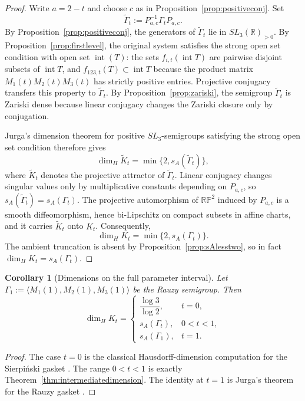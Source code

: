 \documentclass[11pt]{amsart}
\newtheorem{corollary}[corollary]{Corollary}
\theoremstyle{definition}
\newcommand{\R}{\mathbb{R}}
\begin{document}
\begin{proof}
Write $a=2-t$ and choose $c$ as in Proposition~\ref{prop:positiveconj}. Set
\[
\widetilde\Gamma_t:=P_{a,c}^{-1}\Gamma_t P_{a,c}.
\]
By Proposition~\ref{prop:positiveconj}, the generators of $\widetilde\Gamma_t$ lie in $SL_3(\R)_{>0}$. By Proposition~\ref{prop:firstlevel}, the original system satisfies the strong open set condition with open set $\operatorname{int}(T)$: the sets $f_{i,t}(\operatorname{int}T)$ are pairwise disjoint subsets of $\operatorname{int}T$, and $f_{123,t}(T)\subset \operatorname{int}T$ because the product matrix $M_1(t)M_2(t)M_3(t)$ has strictly positive entries. Projective conjugacy transfers this property to $\widetilde\Gamma_t$. By Proposition~\ref{prop:zariski}, the semigroup $\widetilde\Gamma_t$ is Zariski dense because linear conjugacy changes the Zariski closure only by conjugation.

Jurga's dimension theorem for positive $SL_3$-semigroups satisfying the strong open set condition \cite[Theorem~1.3]{Jurga2026} therefore gives
\[
\dim_H \widetilde K_t = \min\{2,s_A(\widetilde\Gamma_t)\},
\]
where $\widetilde K_t$ denotes the projective attractor of $\widetilde\Gamma_t$. Linear conjugacy changes singular values only by multiplicative constants depending on $P_{a,c}$, so $s_A(\widetilde\Gamma_t)=s_A(\Gamma_t)$. The projective automorphism of $\mathbb{RP}^2$ induced by $P_{a,c}$ is a smooth diffeomorphism, hence bi-Lipschitz on compact subsets in affine charts, and it carries $\widetilde K_t$ onto $K_t$. Consequently,
\[
\dim_H K_t=\min\{2,s_A(\Gamma_t)\}.
\]
The ambient truncation is absent by Proposition~\ref{prop:sAlesstwo}, so in fact $\dim_H K_t=s_A(\Gamma_t)$.
\end{proof}

\begin{corollary}[Dimensions on the full parameter interval]\label{cor:fulldimensions}
Let $\Gamma_1:=\langle M_1(1),M_2(1),M_3(1)\rangle$ be the Rauzy semigroup. Then
\[
\dim_H K_t=
\begin{cases}
\dfrac{\log 3}{\log 2},& t=0,\\[1ex]
s_A(\Gamma_t),& 0<t<1,\\[1ex]
s_A(\Gamma_1),& t=1.
\end{cases}
\]
\end{corollary}

\begin{proof}
The case $t=0$ is the classical Hausdorff-dimension computation for the Sierpi\'nski gasket \cite{Hutchinson1981}. The range $0<t<1$ is exactly Theorem~\ref{thm:intermediatedimension}. The identity at $t=1$ is Jurga's theorem for the Rauzy gasket \cite{Jurga2026}.
\end{proof}
\end{document}
